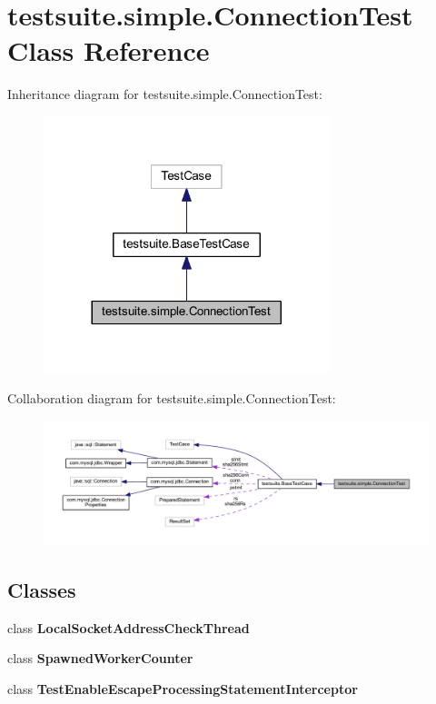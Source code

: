 \hypertarget{classtestsuite_1_1simple_1_1_connection_test}{}\section{testsuite.\+simple.\+Connection\+Test Class Reference}
\label{classtestsuite_1_1simple_1_1_connection_test}


Inheritance diagram for testsuite.\+simple.\+Connection\+Test\+:
\nopagebreak
\begin{figure}[H]
\begin{center}
\leavevmode
\includegraphics[width=236pt]{classtestsuite_1_1simple_1_1_connection_test__inherit__graph}
\end{center}
\end{figure}


Collaboration diagram for testsuite.\+simple.\+Connection\+Test\+:
\nopagebreak
\begin{figure}[H]
\begin{center}
\leavevmode
\includegraphics[width=350pt]{classtestsuite_1_1simple_1_1_connection_test__coll__graph}
\end{center}
\end{figure}
\subsection*{Classes}
\begin{DoxyCompactItemize}
\item 
class {\bfseries Local\+Socket\+Address\+Check\+Thread}
\item 
class {\bfseries Spawned\+Worker\+Counter}
\item 
class {\bfseries Test\+Enable\+Escape\+Processing\+Statement\+Interceptor}
\end{DoxyCompactItemize}
